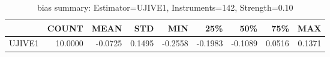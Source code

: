 \begin{table}[ht]
\centering
\caption{bias summary: Estimator=UJIVE1, Instruments=142, Strength=0.10}
\begin{tabular}{lrrrrrrrr}
\toprule
 & COUNT & MEAN & STD & MIN & 25\% & 50\% & 75\% & MAX \\
\midrule
UJIVE1 & 10.0000 & -0.0725 & 0.1495 & -0.2558 & -0.1983 & -0.1089 & 0.0516 & 0.1371 \\
\bottomrule
\end{tabular}
\end{table}
